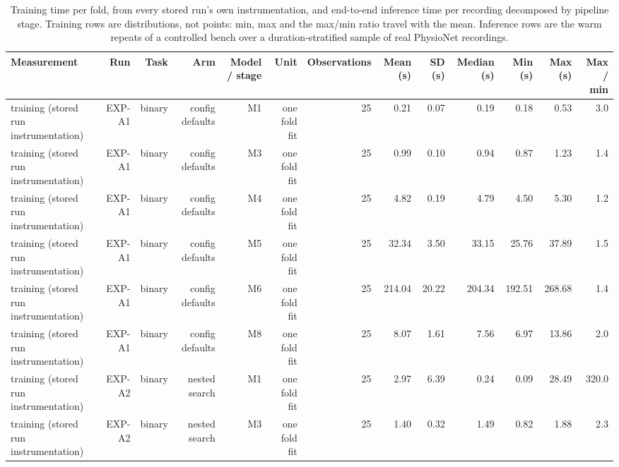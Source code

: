 \begin{table}[htbp]
  \centering
  \caption{Training time per fold, from every stored run's own instrumentation, and end-to-end inference time per recording decomposed by pipeline stage. Training rows are distributions, not points: min, max and the max/min ratio travel with the mean. Inference rows are the warm repeats of a controlled bench over a duration-stratified sample of real PhysioNet recordings.}
  \label{tab:t25}
  \begin{tabular}{lrrrrrrrrrrrr}
    \toprule
    Measurement & Run & Task & Arm & Model / stage & Unit & Observations & Mean (s) & SD (s) & Median (s) & Min (s) & Max (s) & Max / min \\
    \midrule
    training (stored run instrumentation) & EXP-A1 & binary & config defaults & M1 & one fold fit & 25 & 0.21 & 0.07 & 0.19 & 0.18 & 0.53 & 3.0 \\
    training (stored run instrumentation) & EXP-A1 & binary & config defaults & M3 & one fold fit & 25 & 0.99 & 0.10 & 0.94 & 0.87 & 1.23 & 1.4 \\
    training (stored run instrumentation) & EXP-A1 & binary & config defaults & M4 & one fold fit & 25 & 4.82 & 0.19 & 4.79 & 4.50 & 5.30 & 1.2 \\
    training (stored run instrumentation) & EXP-A1 & binary & config defaults & M5 & one fold fit & 25 & 32.34 & 3.50 & 33.15 & 25.76 & 37.89 & 1.5 \\
    training (stored run instrumentation) & EXP-A1 & binary & config defaults & M6 & one fold fit & 25 & 214.04 & 20.22 & 204.34 & 192.51 & 268.68 & 1.4 \\
    training (stored run instrumentation) & EXP-A1 & binary & config defaults & M8 & one fold fit & 25 & 8.07 & 1.61 & 7.56 & 6.97 & 13.86 & 2.0 \\
    training (stored run instrumentation) & EXP-A2 & binary & nested search & M1 & one fold fit & 25 & 2.97 & 6.39 & 0.24 & 0.09 & 28.49 & 320.0 \\
    training (stored run instrumentation) & EXP-A2 & binary & nested search & M3 & one fold fit & 25 & 1.40 & 0.32 & 1.49 & 0.82 & 1.88 & 2.3 \\

\end{tabular}
\end{table}
